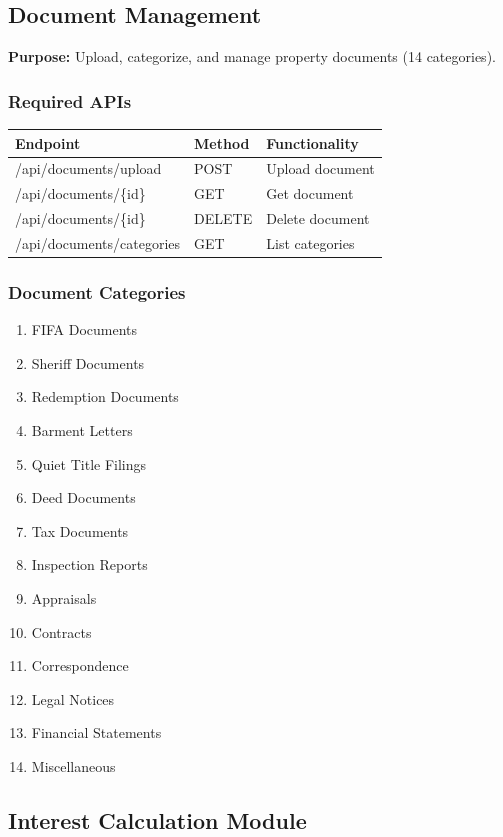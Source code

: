 \documentclass[11pt,a4paper]{article}
\begin{document}
\subsection{Document Management}

\textbf{Purpose:} Upload, categorize, and manage property documents (14 categories).

\subsubsection{Required APIs}

\begin{longtable}{|p{5cm}|p{2cm}|p{6cm}|}
\hline
\textbf{Endpoint} & \textbf{Method} & \textbf{Functionality} \\
\hline
/api/documents/upload & POST & Upload document \\
/api/documents/\{id\} & GET & Get document \\
/api/documents/\{id\} & DELETE & Delete document \\
/api/documents/categories & GET & List categories \\
\hline
\end{longtable}

\subsubsection{Document Categories}
\begin{enumerate}
    \item FIFA Documents
    \item Sheriff Documents
    \item Redemption Documents
    \item Barment Letters
    \item Quiet Title Filings
    \item Deed Documents
    \item Tax Documents
    \item Inspection Reports
    \item Appraisals
    \item Contracts
    \item Correspondence
    \item Legal Notices
    \item Financial Statements
    \item Miscellaneous
\end{enumerate}

\subsection{Interest Calculation Module}
\end{document}
